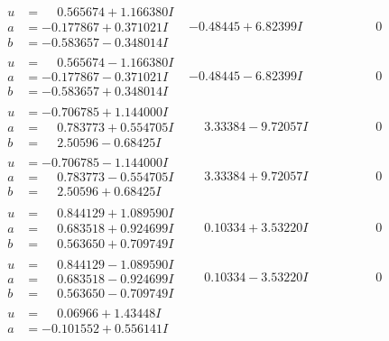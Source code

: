 \documentclass[1p]{elsarticle_modified}
\theoremstyle{definition}
\begin{document}
$$\begin{array}{c|c|c}
 \hline 
\begin{aligned}
u &= \phantom{-}0.565674 + 1.166380 I \\
a &= -0.177867 + 0.371021 I \\
b &= -0.583657 - 0.348014 I\end{aligned}
 & -0.48445 + 6.82399 I & \phantom{-0.000000 } 0 \\ \hline\begin{aligned}
u &= \phantom{-}0.565674 - 1.166380 I \\
a &= -0.177867 - 0.371021 I \\
b &= -0.583657 + 0.348014 I\end{aligned}
 & -0.48445 - 6.82399 I & \phantom{-0.000000 } 0 \\ \hline\begin{aligned}
u &= -0.706785 + 1.144000 I \\
a &= \phantom{-}0.783773 + 0.554705 I \\
b &= \phantom{-}2.50596 - 0.68425 I\end{aligned}
 & \phantom{-}3.33384 - 9.72057 I & \phantom{-0.000000 } 0 \\ \hline\begin{aligned}
u &= -0.706785 - 1.144000 I \\
a &= \phantom{-}0.783773 - 0.554705 I \\
b &= \phantom{-}2.50596 + 0.68425 I\end{aligned}
 & \phantom{-}3.33384 + 9.72057 I & \phantom{-0.000000 } 0 \\ \hline\begin{aligned}
u &= \phantom{-}0.844129 + 1.089590 I \\
a &= \phantom{-}0.683518 + 0.924699 I \\
b &= \phantom{-}0.563650 + 0.709749 I\end{aligned}
 & \phantom{-}0.10334 + 3.53220 I & \phantom{-0.000000 } 0 \\ \hline\begin{aligned}
u &= \phantom{-}0.844129 - 1.089590 I \\
a &= \phantom{-}0.683518 - 0.924699 I \\
b &= \phantom{-}0.563650 - 0.709749 I\end{aligned}
 & \phantom{-}0.10334 - 3.53220 I & \phantom{-0.000000 } 0 \\ \hline\begin{aligned}
u &= \phantom{-}0.06966 + 1.43448 I \\
a &= -0.101552 + 0.556141 I \\

\end{aligned}
\end{array}$$
\end{document}
